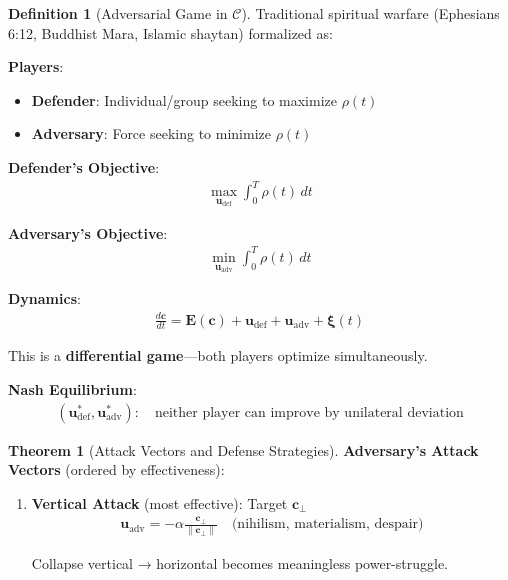 \documentclass[11pt,a4paper]{article}
\theoremstyle{definition}
\newtheorem{definition}{Definition}[section]
\newtheorem{theorem}{Theorem}[section]
\theoremstyle{remark}
\newcommand{\CC}{\mathcal{C}}
\newcommand{\EE}{\mathbf{E}}
\newcommand{\cc}{\mathbf{c}}
\begin{document}
\begin{small}
\begin{enumerate}
\begin{definition}[Adversarial Game in \(\CC\)]
Traditional spiritual warfare (Ephesians 6:12, Buddhist Mara, Islamic shaytan) formalized as:

\textbf{Players}:
\begin{itemize}
    \item \textbf{Defender}: Individual/group seeking to maximize \(\rho(t)\)
    \item \textbf{Adversary}: Force seeking to minimize \(\rho(t)\)
\end{itemize}

\textbf{Defender's Objective}:
\begin{align}
\max_{\mathbf{u}_{\text{def}}} \int_0^T \rho(t) \, dt
\end{align}

\textbf{Adversary's Objective}:
\begin{align}
\min_{\mathbf{u}_{\text{adv}}} \int_0^T \rho(t) \, dt
\end{align}

\textbf{Dynamics}:
\begin{align}
\frac{d\cc}{dt} = \EE(\cc) + \mathbf{u}_{\text{def}} + \mathbf{u}_{\text{adv}} + \boldsymbol{\xi}(t)
\end{align}

This is a \textbf{differential game}—both players optimize simultaneously.

\textbf{Nash Equilibrium}:
\begin{align}
(\mathbf{u}^*_{\text{def}}, \mathbf{u}^*_{\text{adv}}) : \quad \text{neither player can improve by unilateral deviation}
\end{align}
\end{definition}

\begin{theorem}[Attack Vectors and Defense Strategies]
\textbf{Adversary's Attack Vectors} (ordered by effectiveness):

\begin{enumerate}
    \item \textbf{Vertical Attack} (most effective): Target \(\cc_\perp\)
        \begin{align}
        \mathbf{u}_{\text{adv}} = -\alpha \frac{\cc_\perp}{\|\cc_\perp\|} \quad \text{(nihilism, materialism, despair)}
        \end{align}
        
        Collapse vertical → horizontal becomes meaningless power-struggle.
    

\end{enumerate}
\end{theorem}
\end{enumerate}
\end{small}
\end{document}
